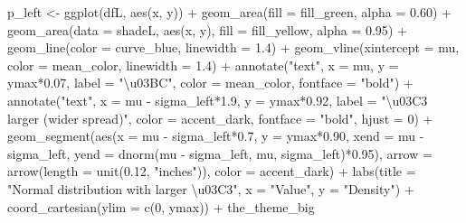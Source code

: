 \documentclass[
  letterpaper,
  DIV=11,
  numbers=noendperiod]{scrreprt}
\newenvironment{Shaded}{\begin{snugshade}}{\end{snugshade}}
\newcommand{\AttributeTok}[1]{\textcolor[rgb]{0.40,0.45,0.13}{#1}}
\newcommand{\DecValTok}[1]{\textcolor[rgb]{0.68,0.00,0.00}{#1}}
\newcommand{\FloatTok}[1]{\textcolor[rgb]{0.68,0.00,0.00}{#1}}
\newcommand{\FunctionTok}[1]{\textcolor[rgb]{0.28,0.35,0.67}{#1}}
\newcommand{\NormalTok}[1]{\textcolor[rgb]{0.00,0.23,0.31}{#1}}
\newcommand{\OtherTok}[1]{\textcolor[rgb]{0.00,0.23,0.31}{#1}}
\newcommand{\SpecialCharTok}[1]{\textcolor[rgb]{0.37,0.37,0.37}{#1}}
\newcommand{\StringTok}[1]{\textcolor[rgb]{0.13,0.47,0.30}{#1}}
\begin{document}
\begin{Shaded}
\begin{Highlighting}[]
\NormalTok{p\_left }\OtherTok{\textless{}{-}} \FunctionTok{ggplot}\NormalTok{(dfL, }\FunctionTok{aes}\NormalTok{(x, y)) }\SpecialCharTok{+}
  \FunctionTok{geom\_area}\NormalTok{(}\AttributeTok{fill =}\NormalTok{ fill\_green, }\AttributeTok{alpha =} \FloatTok{0.60}\NormalTok{) }\SpecialCharTok{+}
  \FunctionTok{geom\_area}\NormalTok{(}\AttributeTok{data =}\NormalTok{ shadeL, }\FunctionTok{aes}\NormalTok{(x, y), }\AttributeTok{fill =}\NormalTok{ fill\_yellow, }\AttributeTok{alpha =} \FloatTok{0.95}\NormalTok{) }\SpecialCharTok{+}
  \FunctionTok{geom\_line}\NormalTok{(}\AttributeTok{color =}\NormalTok{ curve\_blue, }\AttributeTok{linewidth =} \FloatTok{1.4}\NormalTok{) }\SpecialCharTok{+}
  \FunctionTok{geom\_vline}\NormalTok{(}\AttributeTok{xintercept =}\NormalTok{ mu, }\AttributeTok{color =}\NormalTok{ mean\_color, }\AttributeTok{linewidth =} \FloatTok{1.4}\NormalTok{) }\SpecialCharTok{+}
  \FunctionTok{annotate}\NormalTok{(}\StringTok{"text"}\NormalTok{, }\AttributeTok{x =}\NormalTok{ mu, }\AttributeTok{y =}\NormalTok{ ymax}\SpecialCharTok{*}\FloatTok{0.07}\NormalTok{, }\AttributeTok{label =} \StringTok{"\textbackslash{}u03BC"}\NormalTok{, }\AttributeTok{color =}\NormalTok{ mean\_color, }\AttributeTok{fontface =} \StringTok{"bold"}\NormalTok{) }\SpecialCharTok{+}
  \FunctionTok{annotate}\NormalTok{(}\StringTok{"text"}\NormalTok{, }\AttributeTok{x =}\NormalTok{ mu }\SpecialCharTok{{-}}\NormalTok{ sigma\_left}\SpecialCharTok{*}\FloatTok{1.9}\NormalTok{, }\AttributeTok{y =}\NormalTok{ ymax}\SpecialCharTok{*}\FloatTok{0.92}\NormalTok{, }\AttributeTok{label =} \StringTok{"\textbackslash{}u03C3 larger (wider spread)"}\NormalTok{, }\AttributeTok{color =}\NormalTok{ accent\_dark, }\AttributeTok{fontface =} \StringTok{"bold"}\NormalTok{, }\AttributeTok{hjust =} \DecValTok{0}\NormalTok{) }\SpecialCharTok{+}
  \FunctionTok{geom\_segment}\NormalTok{(}\FunctionTok{aes}\NormalTok{(}\AttributeTok{x =}\NormalTok{ mu }\SpecialCharTok{{-}}\NormalTok{ sigma\_left}\SpecialCharTok{*}\FloatTok{0.7}\NormalTok{, }\AttributeTok{y =}\NormalTok{ ymax}\SpecialCharTok{*}\FloatTok{0.90}\NormalTok{, }\AttributeTok{xend =}\NormalTok{ mu }\SpecialCharTok{{-}}\NormalTok{ sigma\_left, }\AttributeTok{yend =} \FunctionTok{dnorm}\NormalTok{(mu }\SpecialCharTok{{-}}\NormalTok{ sigma\_left, mu, sigma\_left)}\SpecialCharTok{*}\FloatTok{0.95}\NormalTok{),}
               \AttributeTok{arrow =} \FunctionTok{arrow}\NormalTok{(}\AttributeTok{length =} \FunctionTok{unit}\NormalTok{(}\FloatTok{0.12}\NormalTok{, }\StringTok{"inches"}\NormalTok{)), }\AttributeTok{color =}\NormalTok{ accent\_dark) }\SpecialCharTok{+}
  \FunctionTok{labs}\NormalTok{(}\AttributeTok{title =} \StringTok{"Normal distribution with larger \textbackslash{}u03C3"}\NormalTok{, }\AttributeTok{x =} \StringTok{"Value"}\NormalTok{, }\AttributeTok{y =} \StringTok{"Density"}\NormalTok{) }\SpecialCharTok{+}
  \FunctionTok{coord\_cartesian}\NormalTok{(}\AttributeTok{ylim =} \FunctionTok{c}\NormalTok{(}\DecValTok{0}\NormalTok{, ymax)) }\SpecialCharTok{+}
\NormalTok{  the\_theme\_big}


\end{Highlighting}
\end{Shaded}
\end{document}
